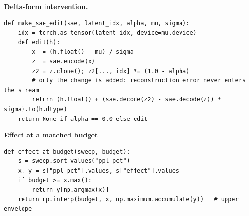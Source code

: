 \documentclass[11pt,a4paper]{article}
\theoremstyle{remark}
\begin{document}
\medskip\noindent\textbf{Delta-form intervention.}\par\nobreak\smallskip
\begin{lstlisting}[style=py]
def make_sae_edit(sae, latent_idx, alpha, mu, sigma):
    idx = torch.as_tensor(latent_idx, device=mu.device)
    def edit(h):
        x  = (h.float() - mu) / sigma
        z  = sae.encode(x)
        z2 = z.clone(); z2[..., idx] *= (1.0 - alpha)
        # only the change is added: reconstruction error never enters the stream
        return (h.float() + (sae.decode(z2) - sae.decode(z)) * sigma).to(h.dtype)
    return None if alpha == 0.0 else edit
\end{lstlisting}

\medskip\noindent\textbf{Effect at a matched budget.}\par\nobreak\smallskip
\begin{lstlisting}[style=py]
def effect_at_budget(sweep, budget):
    s = sweep.sort_values("ppl_pct")
    x, y = s["ppl_pct"].values, s["effect"].values
    if budget >= x.max():
        return y[np.argmax(x)]
    return np.interp(budget, x, np.maximum.accumulate(y))   # upper envelope
\end{lstlisting}
\end{document}
